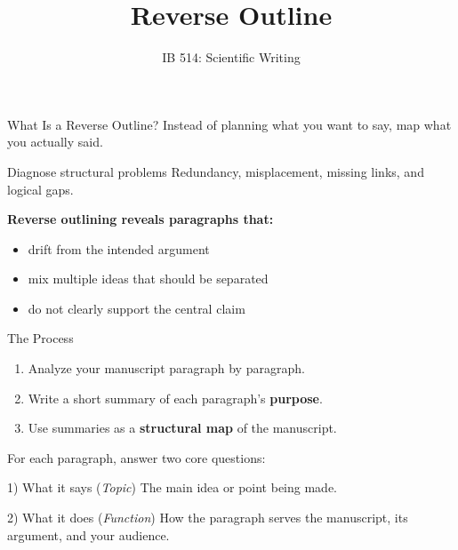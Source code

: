 \documentclass{beamer}
\title{Reverse Outline}
\author[]{IB 514: Scientific Writing}
\date[]{}
\begin{document}
\begin{frame}
  \titlepage
\end{frame}

\begin{frame}{What Is a Reverse Outline?}
  Instead of planning what you want to say, map what you actually said.

  \medskip
  \begin{block}{Diagnose structural problems}
    Redundancy, misplacement, missing links, and logical gaps.
  \end{block}

  \medskip
  \textbf{Reverse outlining reveals paragraphs that:}
  \begin{itemize}
    \item drift from the intended argument
    \item mix multiple ideas that should be separated
    \item do not clearly support the central claim
  \end{itemize}

 \end{frame}

\begin{frame}{The Process}

  \begin{enumerate}
    \item Analyze your manuscript paragraph by paragraph.
    \item Write a short summary of each paragraph's \textbf{purpose}.
    \item Use summaries as a \textbf{structural map} of the manuscript.
  \end{enumerate}
  
  \medskip

  For each paragraph, answer two core questions:

  \medskip
  \begin{block}{1) What it says (\emph{Topic})}
    The main idea or point being made.
  \end{block}

  \begin{block}{2) What it does (\emph{Function})}
    How the paragraph serves the manuscript, its argument, and your audience.
  \end{block}

\end{frame}
\end{document}
